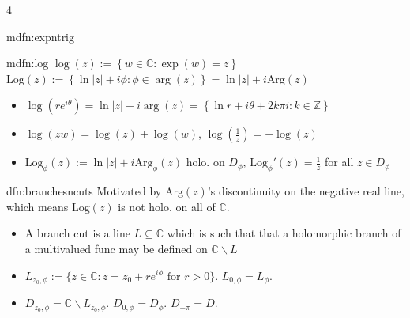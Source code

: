 \documentclass[landscape, 8pt]{extarticle}
\begin{document}
\begin{multicols*}{4}
\begin{mdfn}{mdfn:expntrig}{ }
		\end{mdfn}
		
		
		\begin{mdfn}{mdfn:log}{ }
			$\log(z) := \left\{w \in \mathbb{C} : \exp(w) = z\right\}$ \\
			$\text{Log}(z) := \left\{ \ln \left|z\right| + i\phi : \phi \in \arg(z)\right\} = \ln\left|z\right| + i \text{Arg}(z)$
			\begin{itemize}
				\item $\log(re^{i\theta}) = \ln\left|z\right| + i \arg(z) = \left\{\ln r + i\theta + 2k\pi i: k\in \mathbb{Z}\right\}$
				\item $\log(zw) = \log(z) + \log(w)$, $\log(\frac{1}{z}) = -\log(z)$
				\item $\text{Log}_\phi(z) := \ln \left|z\right| + i \text{Arg}_\phi(z)$ holo. on $D_\phi$, $\text{Log}_\phi'(z) = \frac{1}{z}$ for all $z \in D_\phi$
			\end{itemize}
			
			
			
		\end{mdfn}
		
		
		\begin{dfn}{dfn:branchesncuts}{ }
			Motivated by $\text{Arg}(z)$'s discontinuity on the negative real line, \\
			which means $\text{Log}(z)$ is not holo. on all of $\mathbb{C}$.
			\begin{itemize}
				\item A branch cut is a line $L \subseteq \mathbb{C}$ which is such that that a holomorphic branch of a multivalued func may be defined on $\mathbb{C} \backslash L$
				\item $L_{z_0, \phi} := \{z \in \mathbb{C} : z = z_0 + r e^{i \phi} \text{ for } r>0\}$. $L_{0, \phi} = L_\phi$.
				\item $D_{z_0, \phi} = \mathbb{C} \backslash L_{z_0, \phi}$. $D_{0, \phi} = D_\phi$. $D_{-\pi} = D$.
			\end{itemize}
			
			
		\end{dfn}
		

\end{multicols*}
\end{document}
